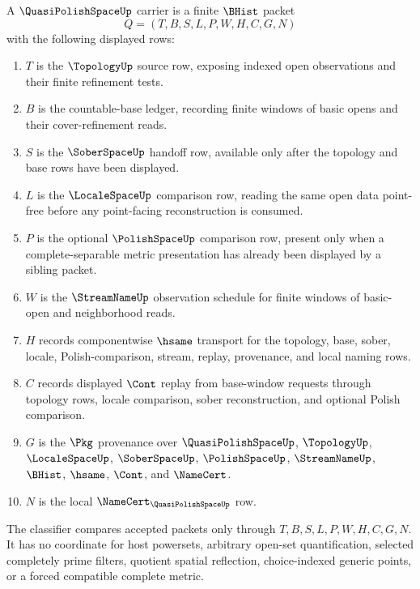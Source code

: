 \begin{definition}
\label{def:quasi-polish-space-carrier}
A $\QuasiPolishSpaceUp$ carrier is a finite $\BHist$ packet
$$
Q=(T,B,S,L,P,W,H,C,G,N)
$$
with the following displayed rows:
\begin{enumerate}
\item $T$ is the $\TopologyUp$ source row, exposing indexed open observations and their finite refinement tests.
\item $B$ is the countable-base ledger, recording finite windows of basic opens and their cover-refinement reads.
\item $S$ is the $\SoberSpaceUp$ handoff row, available only after the topology and base rows have been displayed.
\item $L$ is the $\LocaleSpaceUp$ comparison row, reading the same open data point-free before any point-facing reconstruction is consumed.
\item $P$ is the optional $\PolishSpaceUp$ comparison row, present only when a complete-separable metric presentation has already been displayed by a sibling packet.
\item $W$ is the $\StreamNameUp$ observation schedule for finite windows of basic-open and neighborhood reads.
\item $H$ records componentwise $\hsame$ transport for the topology, base, sober, locale, Polish-comparison, stream, replay, provenance, and local naming rows.
\item $C$ records displayed $\Cont$ replay from base-window requests through topology rows, locale comparison, sober reconstruction, and optional Polish comparison.
\item $G$ is the $\Pkg$ provenance over $\QuasiPolishSpaceUp$, $\TopologyUp$, $\LocaleSpaceUp$, $\SoberSpaceUp$, $\PolishSpaceUp$, $\StreamNameUp$, $\BHist$, $\hsame$, $\Cont$, and $\NameCert$.
\item $N$ is the local $\NameCert_{\QuasiPolishSpaceUp}$ row.
\end{enumerate}
The classifier compares accepted packets only through $T,B,S,L,P,W,H,C,G,N$. It has no coordinate for host powersets, arbitrary open-set quantification, selected completely prime filters, quotient spatial reflection, choice-indexed generic points, or a forced compatible complete metric.
\end{definition}

